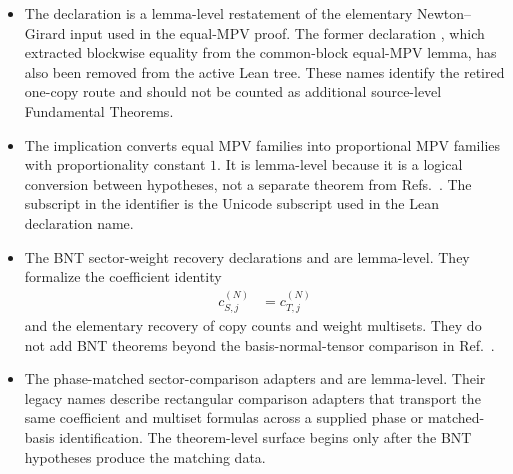 \documentclass{article}
\begin{document}
\begin{itemize}
\begin{align}
          \end{align}
          See lines~217--219 of Ref.~\cite{Cirac2016MPDO_arXiv}.
    \item The declaration
           is a lemma-level
          restatement of the elementary Newton--Girard input used in the
          equal-MPV proof. The former declaration
          , which extracted
          blockwise equality from the common-block equal-MPV lemma, has also
          been removed from the active Lean tree. These names identify the
          retired one-copy route and should not be counted as additional
          source-level Fundamental Theorems.
    \item The implication
           converts equal MPV
          families into proportional MPV families with proportionality
          constant $1$. It is lemma-level because it is a logical conversion
          between hypotheses, not a separate theorem from
          Refs.~\cite{Cirac2016MPDO_arXiv,Cirac2021Matrix}. The subscript in
          the identifier is the Unicode subscript used in the Lean declaration
          name.
    \item The BNT sector-weight recovery declarations
           and
          are lemma-level. They formalize the coefficient identity
          \begin{align}
              c_{S,j}^{(N)}
                  &=
                  c_{T,j}^{(N)}
              \label{eq:tnlean_bnt_ft_theorem_surface_matched_sector_coefficients}
          \end{align}
          and the elementary recovery of copy counts and weight multisets.
          They do not add BNT theorems beyond the basis-normal-tensor
          comparison in Ref.~\cite{Cirac2016MPDO_arXiv}.
    \item The phase-matched sector-comparison adapters
          and
          are lemma-level. Their legacy names describe rectangular comparison
          adapters that transport the same coefficient and multiset formulas
          across a supplied phase or matched-basis identification. The
          theorem-level surface begins only after the BNT hypotheses produce
          the matching data.
\end{itemize}
\end{document}
